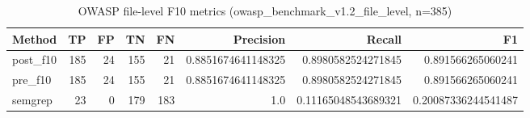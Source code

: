 \begin{table}[h]
\centering
\begin{tabular}{lrrrrrrr}
\hline
Method & TP & FP & TN & FN & Precision & Recall & F1 \\
\hline
post\_f10 & 185 & 24 & 155 & 21 & 0.8851674641148325 & 0.8980582524271845 & 0.891566265060241 \\
pre\_f10 & 185 & 24 & 155 & 21 & 0.8851674641148325 & 0.8980582524271845 & 0.891566265060241 \\
semgrep & 23 & 0 & 179 & 183 & 1.0 & 0.11165048543689321 & 0.20087336244541487 \\
\hline
\end{tabular}
\caption{OWASP file-level F10 metrics (owasp\_benchmark\_v1.2\_file\_level, n=385)}
\end{table}
